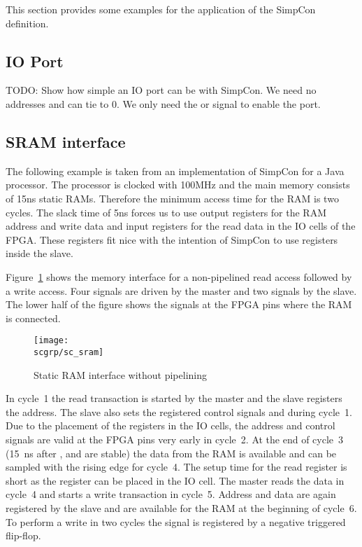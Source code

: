 This section provides some examples for the application of the
SimpCon definition.

\subsection{IO Port}

TODO: Show how simple an IO port can be with SimpCon. We need no
addresses and can tie  to 0. We only need the
 or  signal to enable the port.

\subsection{SRAM interface}

The following example is taken from an implementation of SimpCon for
a Java processor. The processor is clocked with 100MHz and the main
memory consists of 15ns static RAMs. Therefore the minimum access
time for the RAM is two cycles. The slack time of 5ns forces us to
use output registers for the RAM address and write data and input
registers for the read data in the IO cells of the FPGA. These
registers fit nice with the intention of SimpCon to use registers
inside the slave.

Figure~\ref{fig:sc:sram} shows the memory interface for a
non-pipelined read access followed by a write access. Four signals
are driven by the master and two signals by the slave. The lower
half of the figure shows the signals at the FPGA pins where the RAM
is connected.


\begin{figure}
    \centering
    \texttt{[image: \\scgrp/sc\_sram]}
    \caption{Static RAM interface without pipelining}
    \label{fig:sc:sram}
\end{figure}

In cycle~1 the read transaction is started by the master and the
slave registers the address. The slave also sets the registered
control signals  and  during cycle~1. Due to the
placement of the registers in the IO cells, the address and control
signals are valid at the FPGA pins very early in cycle~2. At the end
of cycle~3 (15~ns after ,  and 
are stable) the data from the RAM is available and can be sampled
with the rising edge for cycle~4. The setup time for the read
register is short as the register can be placed in the IO cell. The
master reads the data in cycle~4 and starts a write transaction in
cycle~5. Address and data are again registered by the slave and are
available for the RAM at the beginning of cycle~6. To perform a
write in two cycles the  signal is registered by a
negative triggered flip-flop.

